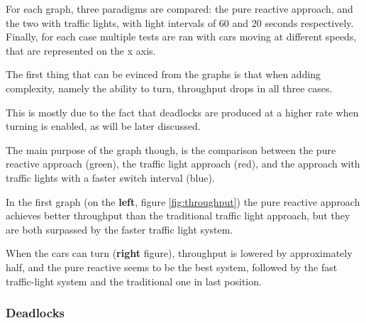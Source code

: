 For each graph, three paradigms are compared: the pure reactive approach, and the two with traffic lights, with light intervals of 60 and 20 seconds respectively.
Finally, for each case multiple tests are ran with cars moving at different speeds, that are represented on the x axis.
\newline

The first thing that can be evinced from the graphs is that when adding complexity, namely the ability to turn, throughput drops in all three cases.


This is mostly due to the fact that deadlocks are produced at a higher rate when turning is enabled, as will be later discussed.

The main purpose of the graph though, is the comparison between the pure reactive approach (green), the traffic light approach (red), and the approach with traffic lights with a faster switch interval (blue).

In the first graph (on the \textbf{left}, figure \ref{fig:throughput}) the pure reactive approach achieves better throughput than the traditional traffic light approach, but they are both surpassed by the faster traffic light system.

When the cars can turn (\textbf{right} figure), throughput is lowered by approximately half, and the pure reactive seems to be the best system, followed by the fast traffic-light system and the traditional one in last position.

\subsubsection{Deadlocks}

